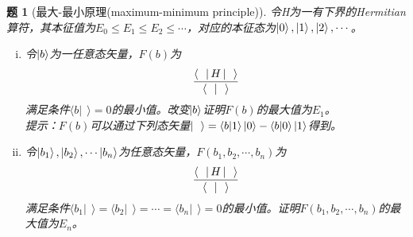 \documentclass[UTF8,10pt,a4paper]{article}
\theoremstyle{Problem}%
\newtheorem{prob}{题}%
\theoremstyle{Solution}%
\begin{document}
\thispagestyle{FirstPageStyle}%
\begin{prob}[最大-最小原理(maximum-minimum principle)]
    令H为一有下界的Hermitian算符，其本征值为$E_0 \leq E_1 \leq E_2 \leq \cdots$，对应的本征态为$\ket{0}, \ket{1}, \ket{2}, \cdots$。
    \vspace{-0.5em}
    \begin{enumerate}[i)]
        \item 令$\ket{b}$为一任意态矢量，$F(b)$为
        \[
            \frac{\bra{~~} H \ket{~~}}{\langle ~~ \vert ~~ \rangle}
        \]
        满足条件$\langle b \vert ~~ \rangle = 0$的最小值。改变$\ket{b}$证明$F(b)$的最大值为$E_1$。 \\
        提示：$F(b)$可以通过下列态矢量$\ket{~~} = \langle b \vert 1 \rangle \ket{0} - \langle b \vert 0 \rangle \ket{1}$得到。
        \item 令$\ket{b_1}, \ket{b_2}, \cdots \ket{b_n}$为任意态矢量，$F(b_1,b_2,\cdots,b_n)$为
        \[
            \frac{\bra{~~} H \ket{~~}}{\langle ~~ \vert ~~ \rangle}
        \]
        满足条件$\langle b_1 \vert ~~ \rangle = \langle b_2 \vert ~~ \rangle =  \cdots = \langle b_n \vert ~~ \rangle = 0$的最小值。证明$F(b_1,b_2,\cdots,b_n)$的最大值为$E_n$。
    \end{enumerate}
\end{prob}
\end{document}

